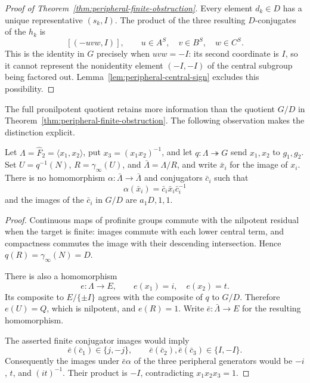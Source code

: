 \begin{proof}[Proof of Theorem~\ref{thm:peripheral-finite-obstruction}]
Every element $d_k\in D$ has a unique representative $(s_k,I)$.
The product of the three resulting $D$-conjugates of the $h_k$ is
\[
[( -uvw,I)],\qquad u\in A^S,\quad v\in B^S,\quad w\in C^S.
\]
This is the identity in $G$ precisely when $uvw=-I$: its second
coordinate is $I$, so it cannot represent the nonidentity element
$(-I,-I)$ of the central subgroup being factored out. Lemma~\ref{lem:peripheral-central-sign}
excludes this possibility.
\end{proof}

The full pronilpotent quotient retains more information than the quotient
$G/D$ in Theorem~\ref{thm:peripheral-finite-obstruction}. The following observation makes the
distinction explicit.

\begin{proposition}\label{prop:peripheral-full-quotient-excludes}
Let $\Lambda=\widehat F_2=\langle x_1,x_2\rangle$, put
$x_3=(x_1x_2)^{-1}$, and let $q:\Lambda\twoheadrightarrow G$ send
$x_1,x_2$ to $g_1,g_2$. Set $U=q^{-1}(N)$, $R=\gamma_{\infty}(U)$, and
$\bar\Lambda=\Lambda/R$, and write $\bar x_i$ for the image of $x_i$.
There is no homomorphism
$\alpha:\bar\Lambda\to\bar\Lambda$ and conjugators $\bar c_i$ such
that
\[
\alpha(\bar x_i)=\bar c_i\bar x_i\bar c_i^{-1}
\]
and the images of the $\bar c_i$ in $G/D$ are $a_1D,1,1$.
\end{proposition}

\begin{proof}
Continuous maps of profinite groups commute with the nilpotent residual
when the target is finite: images commute with each lower central term,
and compactness commutes the image with their descending intersection.
Hence $q(R)=\gamma_{\infty}(N)=D$.

There is also a homomorphism
\[
e:\Lambda\longrightarrow E,\qquad e(x_1)=i,\quad e(x_2)=t.
\]
Its composite to $E/\{\pm I\}$ agrees with the composite of $q$ to
$G/D$. Therefore $e(U)=Q$, which is nilpotent, and $e(R)=1$. Write
$\bar e:\bar\Lambda\to E$ for the resulting homomorphism.

The asserted finite conjugator images would imply
\[
\bar e(\bar c_1)\in\{j,-j\},\qquad
\bar e(\bar c_2),\bar e(\bar c_3)\in\{I,-I\}.
\]
Consequently the images under $\bar e\alpha$ of the three peripheral
generators would be $-i$, $t$, and $(it)^{-1}$. Their product is $-I$,
contradicting $x_1x_2x_3=1$.
\end{proof}
